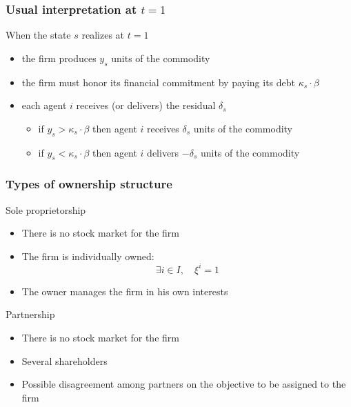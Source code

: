 \documentclass[blue]{beamer}
\theoremstyle{definition}
\theoremstyle{example}
\begin{document}
\begin{frame}\frametitle{Usual interpretation at $t=1$}

When the state $s$ realizes at $t=1$
\begin{itemize}
\item the firm produces $y_s$ units of the commodity
\item the firm must honor its financial commitment by paying its debt $\kappa_s \cdot \beta$
\item each agent $i$ receives (or delivers) the residual $\delta_s$
    \begin{itemize}
    \item if $y_s > \kappa_s \cdot \beta$ then agent $i$ receives $\delta_s$ units of the commodity
    \item if $y_s <\kappa_s \cdot \beta$ then agent $i$ delivers $-\delta_s$ units of the commodity
    \end{itemize}
\end{itemize}

\end{frame}


\begin{frame}\frametitle{Types of ownership structure}

\begin{block}{Sole proprietorship}
\begin{itemize}
\item There is no stock market for the firm
\item The firm is individually owned:
\[
\exists i \in I, \quad \xi^{i}=1
\]
\item The owner manages the firm in his own interests
\end{itemize}
\end{block}

\begin{block}{Partnership}
\begin{itemize}
\item There is no stock market for the firm
\item Several shareholders
\item Possible disagreement among partners on the objective to be assigned to the firm
\end{itemize}
\end{block}

\end{frame}

\end{document}
